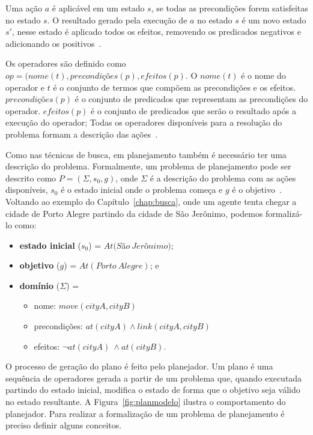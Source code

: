 Uma ação $a$ é aplicável em um estado $s$, se todas as precondições forem satisfeitas no estado $s$. 
O resultado gerado pela execução de $a$ no estado $s$ é um novo estado $s'$, nesse estado é aplicado todos os efeitos, removendo os predicados negativos e adicionando os positivos~\cite{meneguzzi2015planning}.

Os operadores são definido como $op = (nome(t), precondições(p), efeitos(p)$. 
O $nome(t)$ é o nome do operador e $t$ é o conjunto de termos que compõem as precondições e os efeitos. $precondições(p)$ é o conjunto de predicados que representam as precondições do operador. $efeitos(p)$ é o conjunto de predicados que serão o resultado após a execução do operador;
Todas os operadores disponíveis para a resolução do problema formam a descrição das ações~\cite{ghallab2004automated}.
 
Como nas técnicas de busca, em planejamento também é necessário ter uma descrição do problema.
Formalmente, um problema de planejamento pode ser descrito como $P = (\Sigma, s_{0}, g)$, onde $\Sigma$ é a descrição do problema com as ações disponíveis, $s_{0}$ é o estado inicial onde o problema começa e $g$ é o objetivo~\cite{ghallab2004automated}. 
Voltando ao exemplo do Capítulo~\ref{chap:busca}, onde um agente tenta chegar a cidade de Porto Alegre partindo da cidade de São Jerônimo, podemos formalizá-lo como:

\begin{itemize}
	\item \textbf{estado inicial} ($s_{0}$) = $At(S$\~a$o~Jer$\^o$nimo)$;
	\item \textbf{objetivo} ($g$) = $At(Porto~Alegre)$; e
	\item \textbf{domínio} ($\Sigma$) = 
	\begin{itemize}
		\item nome: $move(cityA, cityB)$
		\item precondições: $at(cityA) \wedge link(cityA, cityB)$
		\item efeitos: $\neg at(cityA)~ \wedge at(cityB)$.
	\end{itemize}
\end{itemize}


O processo de geração do plano é feito pelo planejador. 
Um plano é uma sequência de operadores gerada a partir de um problema que, quando executada partindo do estado inicial, modifica o estado de forma que o objetivo seja válido no estado resultante. 
A Figura~\ref{fig:planmodelo} ilustra o comportamento do planejador.
Para realizar a formalização de um problema de planejamento é preciso definir alguns conceitos.

